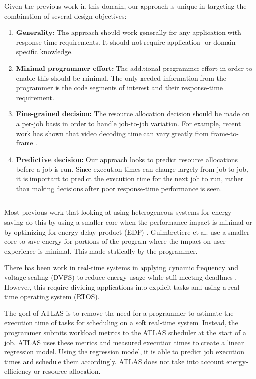 Given the previous work in this domain, our approach is unique in targeting the
combination of several design objectives:
\begin{enumerate}
  \item \textbf{Generality: } The approach should work generally for any
  application with response-time requirements. It should not require
  application- or domain-specific knowledge.
  \item \textbf{Minimal programmer effort: } The additional programmer effort
  in order to enable this should be minimal. The only needed information from
  the programmer is the code segments of interest and their response-time
  requirement.
  \item \textbf{Fine-grained decision: } The resource allocation decision
  should be made on a per-job basis in order to handle job-to-job variation.
  For example, recent work has shown that video decoding time can vary greatly
  from frame-to-frame \cite{atlas-rtas13}. 
  \item \textbf{Predictive decision: } Our approach looks to predict resource
  allocations before a job is run. Since execution times can change largely
  from job to job, it is important to predict the execution time for the next
  job to run, rather than making decisions after poor response-time performance
  is seen.
\end{enumerate}

\subsection{}

Most previous work that looking at using heterogeneous systems for energy
saving do this by using a smaller core when the performance impact is minimal
\cite{padmanabha-micro13, heteroscouts-sigmetrics11, pie-isca12} or by
optimizing for energy-delay product (EDP) \cite{cong-islped12, kumar-micro03,
chen-dac09}.
Guimbretiere et al. \cite{guimbretiere-tecs11} use a smaller core to save
energy for portions of the program where the impact on user experience is
minimal. This made statically by the programmer.

There has been work in real-time systems in applying dynamic frequency and
voltage scaling (DVFS) to reduce energy usage while still meeting deadlines
\cite{rtdvfs-systor12}. However, this require dividing applications into
explicit tasks and using a real-time operating system (RTOS).


The goal of ATLAS \cite{atlas-rtas13} is to remove the need for a programmer to
estimate the execution time of tasks for scheduling on a soft real-time system.
Instead, the programmer submits workload metrics to the ATLAS scheduler at the
start of a job. ATLAS uses these metrics and measured execution times to create
a linear regression model. Using the regression model, it is able to predict
job execution times and schedule them accordingly. ATLAS does not take into
account energy-efficiency or resource allocation.

